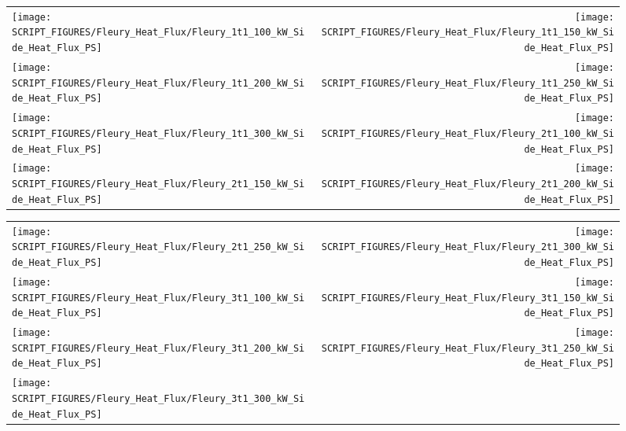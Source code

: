 \begin{figure}[!ht]
\begin{tabular*}{\textwidth}{l@{\extracolsep{\fill}}r}
\texttt{[image: SCRIPT\_FIGURES/Fleury\_Heat\_Flux/Fleury\_1t1\_100\_kW\_Side\_Heat\_Flux\_PS]} &
\texttt{[image: SCRIPT\_FIGURES/Fleury\_Heat\_Flux/Fleury\_1t1\_150\_kW\_Side\_Heat\_Flux\_PS]} \\
\texttt{[image: SCRIPT\_FIGURES/Fleury\_Heat\_Flux/Fleury\_1t1\_200\_kW\_Side\_Heat\_Flux\_PS]} &
\texttt{[image: SCRIPT\_FIGURES/Fleury\_Heat\_Flux/Fleury\_1t1\_250\_kW\_Side\_Heat\_Flux\_PS]} \\
\texttt{[image: SCRIPT\_FIGURES/Fleury\_Heat\_Flux/Fleury\_1t1\_300\_kW\_Side\_Heat\_Flux\_PS]} &
\texttt{[image: SCRIPT\_FIGURES/Fleury\_Heat\_Flux/Fleury\_2t1\_100\_kW\_Side\_Heat\_Flux\_PS]} \\
\texttt{[image: SCRIPT\_FIGURES/Fleury\_Heat\_Flux/Fleury\_2t1\_150\_kW\_Side\_Heat\_Flux\_PS]} &
\texttt{[image: SCRIPT\_FIGURES/Fleury\_Heat\_Flux/Fleury\_2t1\_200\_kW\_Side\_Heat\_Flux\_PS]}
\end{tabular*}
\end{figure}

\begin{figure}[!ht]
\begin{tabular*}{\textwidth}{l@{\extracolsep{\fill}}r}
\texttt{[image: SCRIPT\_FIGURES/Fleury\_Heat\_Flux/Fleury\_2t1\_250\_kW\_Side\_Heat\_Flux\_PS]} &
\texttt{[image: SCRIPT\_FIGURES/Fleury\_Heat\_Flux/Fleury\_2t1\_300\_kW\_Side\_Heat\_Flux\_PS]} \\
\texttt{[image: SCRIPT\_FIGURES/Fleury\_Heat\_Flux/Fleury\_3t1\_100\_kW\_Side\_Heat\_Flux\_PS]} &
\texttt{[image: SCRIPT\_FIGURES/Fleury\_Heat\_Flux/Fleury\_3t1\_150\_kW\_Side\_Heat\_Flux\_PS]} \\
\texttt{[image: SCRIPT\_FIGURES/Fleury\_Heat\_Flux/Fleury\_3t1\_200\_kW\_Side\_Heat\_Flux\_PS]} &
\texttt{[image: SCRIPT\_FIGURES/Fleury\_Heat\_Flux/Fleury\_3t1\_250\_kW\_Side\_Heat\_Flux\_PS]} \\
\texttt{[image: SCRIPT\_FIGURES/Fleury\_Heat\_Flux/Fleury\_3t1\_300\_kW\_Side\_Heat\_Flux\_PS]}
\end{tabular*}
\end{figure}

